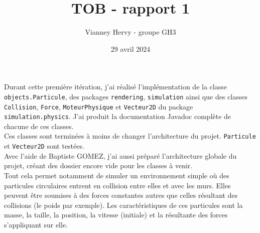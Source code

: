 \documentclass{article}
\title{TOB - rapport 1}
\author{Vianney Hervy - groupe GH3}
\date{29 avril 2024}
\begin{document}
\maketitle

Durant cette première itération, j'ai réalisé l'implémentation de la classe \texttt{objects.Particule}, des packages \texttt{rendering}, \texttt{simulation} ainsi que des classes \texttt{Collision}, \texttt{Force}, \texttt{MoteurPhysique} et \texttt{Vecteur2D} du package \texttt{simulation.physics}. J'ai produit la documentation Javadoc complète de chacune de ces classes. \\

Ces classes sont terminées à moins de changer l'architecture du projet. \texttt{Particule} et \texttt{Vecteur2D} sont testées. \\

Avec l'aide de Baptiste GOMEZ, j'ai aussi préparé l'architecture globale du projet, créant des dossier encore vide pour les classes à venir. \\

Tout cela permet notamment de simuler un environnement simple où des particules circulaires entrent en collision entre elles et avec les murs. Elles peuvent être soumises à des forces constantes autres que celles résultant des collisions (le poids par exemple). Les caractéristiques de ces particules sont la masse, la taille, la position, la vitesse (initiale) et la résultante des forces s'appliquant sur elle.
\end{document}
